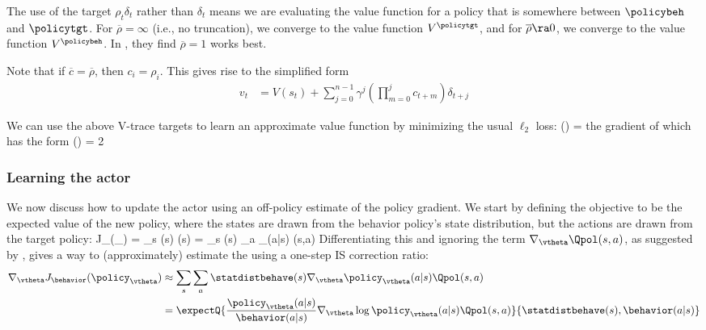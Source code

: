 The use of the target $\rho_t \delta_t$  rather than $\delta_t$
means we are evaluating the value function for a policy
that is somewhere between $\policybeh$ and $\policytgt$.
For $\overline{\rho}=\infty$ (i.e., no truncation),
we converge to the value function $V^{\policytgt}$,
and for $\overline{\rho} \ra 0$,
we converge to the value function $V^{\policybeh}$.
In  \citep{Espeholt2018}, they find $\overline{\rho}=1$ works best.

Note that if $\overline{c}=\overline{\rho}$,
then $c_i=\rho_i$. This gives rise to the simplified form
\begin{align}
  v_t
  &= V(s_t)
  + \sum_{j=0}^{n-1} \gamma^{j} \left( \prod_{m=0}^{j} c_{t+m}
  \right)   \delta_{t+j}
  \label{eqn:Vtrace}
\end{align}

We can use the above V-trace targets to learn an approximate
value function by minimizing the usual $\ell_2$ loss:
\be
\loss(\vw) = 
\ee
the gradient of which has the form
\be
\nabla \loss(\vw) = 2 
\ee


\subsubsection{Learning the actor}
\label{sec:offpolPG}

We now discuss how to update the actor
using an off-policy estimate of the policy gradient.
We start by defining the objective to be
the expected value of the new policy,
where the states are drawn from the behavior
policy's state distribution, but the actions
are drawn from the target policy:
\be
J_{\behavior}(\policy_{\vtheta})
= \sum_s \statdistbehave(s) \Vpol(s)
= \sum_s \statdistbehave(s) \sum_a \policy_{\vtheta}(a|s) \Qpol(s,a)
\label{eqn:offPolicyJ}
\ee
Differentiating this and
ignoring the term $\nabla_{\vtheta} \Qpol(s,a)$, as suggested by \citep{Degris2012},
gives a way to (approximately) estimate the
using a one-step IS correction ratio:
\begin{align}
\nabla_{\vtheta}
 J_{\behavior}(\policy_{\vtheta})
  &\approx \sum_s \sum_a
  \statdistbehave(s) \nabla_{\vtheta} \policy_{\vtheta}(a|s) \Qpol(s,a) \\
  &= \expectQ{  \frac{\policy_{\vtheta}(a|s)}{\behavior(a|s)}
  \nabla_{\vtheta} \log \policy_{\vtheta}(a|s) \Qpol(s,a)}
  {\statdistbehave(s), \behavior(a|s)}
\end{align}

